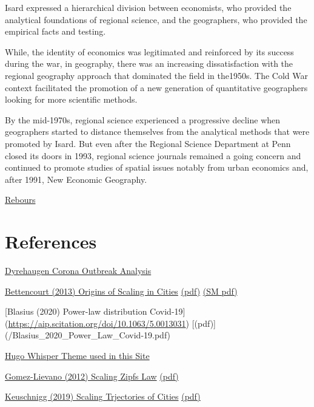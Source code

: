\documentclass[
]{book}
\begin{document}
Isard expressed a hierarchical division between economists, who provided
the analytical foundations of regional science,
and the geographers, who provided the empirical facts and testing.

While, the identity of economics was legitimated and reinforced by its success during the war, in geography, there was an increasing dissatisfaction with the regional geography approach that dominated the field in the1950s. The Cold War context facilitated the promotion of a new generation of quantitative geographers looking for more scientific methods.

By the mid-1970s, regional science experienced a progressive decline when geographers started to distance themselves from the analytical methods that were promoted by Isard. But even after the Regional Science Department at Penn closed its doors in 1993, regional science journals remained a going concern and continued to promote studies of spatial issues notably from urban economics and, after 1991, New Economic Geography.

\href{https://hscif.org/economists-in-the-city-rebours/}{Rebours}

\hypertarget{references}{%
\chapter{References}\label{references}}

\href{https://dyrehaugen.github.io/jdt/coronaanalysis.html}{Dyrehaugen Corona Outbreak Analysis}

\href{https://science.sciencemag.org/content/340/6139/1438}{Bettencourt (2013) Origins of Scaling in Cities}
\href{/Bettencourt_2013_Origins_of_Scaling_in_Cities.pdf}{(pdf)}
\href{/Bettencourt_2013_Origins_of_Scaling_in_Cities_SM.pdf}{(SM pdf)}

{[}Blasius (2020) Power-law distribution Covid-19{]} (\url{https://aip.scitation.org/doi/10.1063/5.0013031})
{[}(pdf){]} (/Blasius\_2020\_Power\_Law\_Covid-19.pdf)

\href{https://themes.gohugo.io/hugo-whisper-theme/}{Hugo Whisper Theme used in this Site}

\href{https://www.researchgate.net/publication/229427747_The_Statistics_of_Urban_Scaling_and_Their_Connection_to_Zipf\%27s_Law}{Gomez-Lievano (2012) Scaling Zipfs Law}
\href{/Gomez-Lievanoetal_2012_Scaling_Zipf.pdf}{(pdf)}

\href{https://www.pnas.org/content/116/28/13759}{Keuschnigg (2019) Scaling Trjectories of Cities}
\href{/Keuschnigg_2019_Scaling_Trjectories_of_Cities.pdf}{(pdf)}
\end{document}
